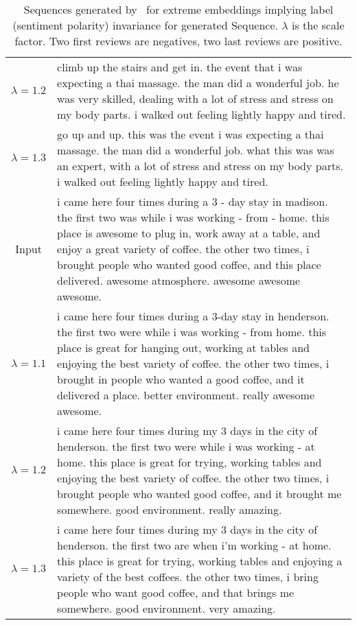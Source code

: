 \begin{table}[ht]
{\begin{tabular}[t]{c|p{16cm}}
\small $\lambda = 1.2$	&climb up the stairs and get in. the event that i was expecting a thai massage. the man did a wonderful job. he was very skilled, dealing with a lot of stress and stress on my body parts. i walked out feeling lightly happy and tired. \\
\small $\lambda = 1.3$	&go up and up. this was the event i was expecting a thai massage. the man did a wonderful job. what this was was an expert, with a lot of stress and stress on my body parts. i walked out feeling lightly happy and tired. \\\hline
\small Input	&i came here four times during a 3 - day stay in madison. the first two was while i was working - from - home. this place is awesome to plug in, work away at a table, and enjoy a great variety of coffee. the other two times, i brought people who wanted good coffee, and this place delivered. awesome atmosphere. awesome awesome awesome. \\
\small $\lambda = 1.1$	&i came here four times during a 3-day stay in henderson. the first two were while i was working - from home. this place is great for hanging out, working at tables and enjoying the best variety of coffee. the other two times, i brought in people who wanted a good coffee, and it delivered a place. better environment. really awesome awesome. \\
\small $\lambda = 1.2$	&i came here four times during my 3 days in the city of henderson. the first two were while i was working - at home. this place is great for trying, working tables and enjoying the best variety of coffee. the other two times, i brought people who wanted good coffee, and it brought me somewhere. good environment. really amazing. \\
\small $\lambda = 1.3$	&i came here four times during my 3 days in the city of henderson. the first two are when i'm working - at home. this place is great for trying, working tables and enjoying a variety of the best coffees. the other two times, i bring people who want good coffee, and that brings me somewhere. good environment. very amazing.\\\hline
\end{tabular}}
\caption{Sequences generated by \geneliex\ for extreme embeddings implying label (sentiment polarity) invariance for generated Sequence. $\lambda$ is the scale factor. Two first reviews are negatives, two last reviews are positive.}
\label{tab:additional_example_sentences}
\end{table}


